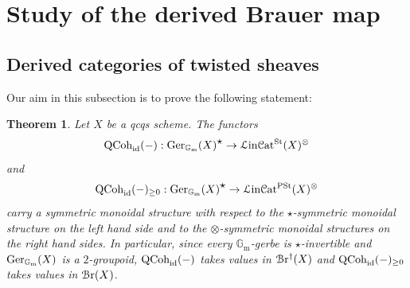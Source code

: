 \documentclass[11pt, twoside]{article} %
\numberwithin{equation}{section}
\theoremstyle{plain}
\newtheorem{thm}{Theorem}[section]
\theoremstyle{definition}
\newcommand{\Gm}{\mathbb G_{\mathrm{m}}}
\newcommand{\id}{\textup{id}}
\newcommand{\QCoh}{\textup{QCoh}}
\newcommand{\BGm}{\textup{B}\Gm}
\newcommand{\tH}{\textup{H}}
\newcommand{\cBr}{\mathcal{B}\textup{r}}
\newcommand{\cBre}{\mathcal{B}\textup{r}^\dagger}
\newcommand{\Ger}{\textup{Ger}}
\newcommand{\Lin}{\mathcal L\textup{in}\mathcal{C}\textup{at}^{\textup{St}}}
\newcommand{\Linpre}{{\mathcal L\textup{in}\mathcal{C}\textup{at}^{\textup{PSt}}}}
\begin{document}
\section{Study of the derived Brauer map}\label{Section-2}


	
 \subsection{Derived categories of twisted sheaves}\label{QCoh-id-cn-is-invertible}
	

	
	


	Our aim in this subsection is to prove the following statement:
	\begin{thm}\label{id-is-invertible}Let $X$ be a qcqs scheme. The functors $$\QCoh_\id(-):\Ger_{\Gm}(X)^{\mathlarger\star}\to \Lin(X)^\otimes$$ and $$\QCoh_\id(-)_{\geq 0}:\Ger_{\Gm}(X)^{\mathlarger\star}\to \Linpre(X)^{\otimes}$$ carry a symmetric monoidal structure with respect to the $\star$-symmetric monoidal structure on the left hand side and to the $\otimes$-symmetric monoidal structures on the right hand sides. In particular, since every $\Gm$-gerbe is $\star$-invertible and $\Ger_{\Gm}(X)$ is a $2$-groupoid, $\QCoh_\id(-)$ takes values in $\cBre(X)$ and $\QCoh_\id(-)_{\geq 0}$ takes values in $\cBr(X)$.
	\end{thm}
	
\end{document}
